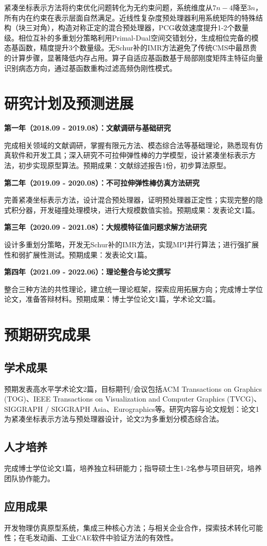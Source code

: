 紧凑坐标表示方法将约束优化问题转化为无约束问题，系统维度从$7n-4$降至$3n$，所有内在约束在表示层面自然满足。近线性复杂度预处理器利用系统矩阵的特殊结构（块三对角），构造对称正定的混合预处理器，PCG收敛速度提升1-2个数量级。相位互补的多重划分策略利用Primal-Dual空间交错划分，生成相位完备的模态基函数，精度提升3个数量级。无Schur补的IMR方法避免了传统CMS中最昂贵的计算步骤，显著降低内存占用。算子自适应基函数基于局部刚度矩阵主特征向量识别病态方向，通过基函数重构过滤高频伪刚性模式。

\section{研究计划及预测进展}

\textbf{第一年（2018.09 - 2019.08）：文献调研与基础研究}

完成相关领域的文献调研，掌握有限元方法、模态综合法等基础理论，熟悉现有仿真软件和开发工具；深入研究不可拉伸弹性棒的力学模型，设计紧凑坐标表示方法，初步实现原型算法。预期成果：文献综述报告1份，初步算法原型。

\textbf{第二年（2019.09 - 2020.08）：不可拉伸弹性棒仿真方法研究}

完善紧凑坐标表示方法，设计混合预处理器，证明预处理器正定性；实现完整的隐式积分器，开发碰撞处理模块，进行大规模数值实验。预期成果：发表论文1篇。

\textbf{第三年（2020.09 - 2021.08）：大规模特征值问题求解方法研究}

设计多重划分策略，开发无Schur补的IMR方法，实现MPI并行算法；进行强扩展性和弱扩展性测试。预期成果：发表论文1篇。

\textbf{第四年（2021.09 - 2022.06）：理论整合与论文撰写}

整合三种方法的共性理论，建立统一理论框架，探索应用拓展方向；完成博士学位论文，准备答辩材料。预期成果：博士学位论文1篇，学术论文2篇。

\section{预期研究成果}

\subsection{学术成果}

预期发表高水平学术论文2篇，目标期刊/会议包括ACM Transactions on Graphics (TOG)、IEEE Transactions on Visualization and Computer Graphics (TVCG)、SIGGRAPH / SIGGRAPH Asia、Eurographics等。研究内容与论文规划：论文1为紧凑坐标表示方法与预处理器设计，论文2为多重划分模态综合法。

\subsection{人才培养}

完成博士学位论文1篇，培养独立科研能力；指导硕士生1-2名参与项目研究，培养团队协作能力。

\subsection{应用成果}

开发物理仿真原型系统，集成三种核心方法；与相关企业合作，探索技术转化可能性；在毛发动画、工业CAE软件中验证方法的有效性。